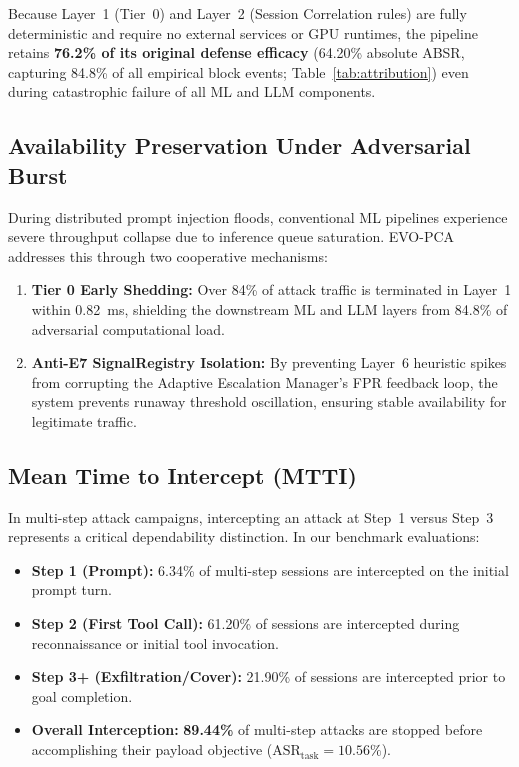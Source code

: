 \documentclass[conference]{IEEEtran}
\begin{document}
Because Layer~1 (Tier~0) and Layer~2 (Session Correlation rules) are fully deterministic and require no external services or GPU runtimes, the pipeline retains \textbf{76.2\% of its original defense efficacy} (64.20\% absolute ABSR, capturing 84.8\% of all empirical block events; Table~\ref{tab:attribution}) even during catastrophic failure of all ML and LLM components.

\subsection{Availability Preservation Under Adversarial Burst}
During distributed prompt injection floods, conventional ML pipelines experience severe throughput collapse due to inference queue saturation. EVO-PCA addresses this through two cooperative mechanisms:
\begin{enumerate}[leftmargin=*]
    \item \textbf{Tier 0 Early Shedding:} Over 84\% of attack traffic is terminated in Layer~1 within 0.82~ms, shielding the downstream ML and LLM layers from 84.8\% of adversarial computational load.
    \item \textbf{Anti-E7 SignalRegistry Isolation:} By preventing Layer~6 heuristic spikes from corrupting the Adaptive Escalation Manager's FPR feedback loop, the system prevents runaway threshold oscillation, ensuring stable availability for legitimate traffic.
\end{enumerate}

\subsection{Mean Time to Intercept (MTTI)}
In multi-step attack campaigns, intercepting an attack at Step~1 versus Step~3 represents a critical dependability distinction. In our benchmark evaluations:
\begin{itemize}[leftmargin=*]
    \item \textbf{Step 1 (Prompt):} 6.34\% of multi-step sessions are intercepted on the initial prompt turn.
    \item \textbf{Step 2 (First Tool Call):} 61.20\% of sessions are intercepted during reconnaissance or initial tool invocation.
    \item \textbf{Step 3+ (Exfiltration/Cover):} 21.90\% of sessions are intercepted prior to goal completion.
    \item \textbf{Overall Interception:} \textbf{89.44\%} of multi-step attacks are stopped before accomplishing their payload objective ($\text{ASR}_{\text{task}} = 10.56\%$).
\end{itemize}
\end{document}
